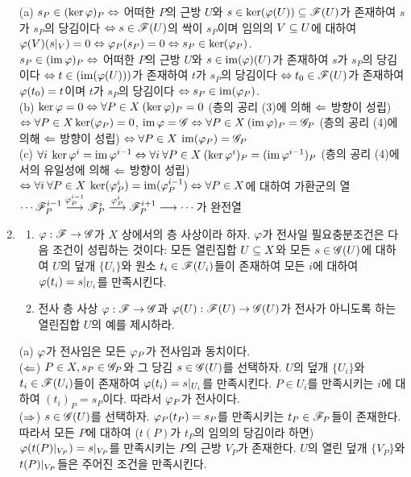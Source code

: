 \begin{enumerate}[label=\tb{1.\arabic*.},itemindent=0mm,itemsep=4mm]
	\sol (a) $s_P\in(\ker\varphi)_P\Leftrightarrow$ 어떠한 $P$의 근방 $U$와 $s\in\ker(\varphi(U))\subseteq\mathscr{F}(U)$가 존재하여 $s$가 $s_P$의 당김이다
	$\Leftrightarrow s\in\mathscr{F}(U)$의 싹이 $s_P$이며 임의의 $V\subseteq U$에 대하여 $\varphi(V)(s|_V)=0\Leftrightarrow\varphi_P(s_P)=0\Leftrightarrow s_P\in\ker(\varphi_P)$.\\
	$s_P\in(\operatorname{im}\varphi)_P\Leftrightarrow$ 어떠한 $P$의 근방 $U$와 $s\in\operatorname{im}(\varphi)(U)$가 존재하여 $s$가 $s_P$의 당김이다
	$\Leftrightarrow t\in(\operatorname{im}(\varphi(U)))$가 존재하여 $t$가 $s_P$의 당김이다
	$\Leftrightarrow t_0\in\mathscr{F}(U)$가 존재하여 $\varphi(t_0)=t$이며 $t$가 $s_P$의 당김이다 $\Leftrightarrow s_P\in\operatorname{im}(\varphi_P)$.\\
	(b) $\ker\varphi=0\Leftrightarrow\forall P\in X\:(\ker\varphi)_P=0$ (층의 공리 (3)에 의해 $\Leftarrow$ 방향이 성립) $\Leftrightarrow\forall P\in X\ker(\varphi_P)=0$,
	$\operatorname{im}\varphi=\mathscr{G}\Leftrightarrow\forall P\in X\:(\operatorname{im}\varphi)_P=\mathscr{G}_P$ (층의 공리 (4)에 의해 $\Leftarrow$ 방향이 성립)
	$\Leftrightarrow\forall P\in X\:\operatorname{im}(\varphi_P)=\mathscr{G}_P$\\
	(c) $\forall i\:\ker\varphi^i=\operatorname{im}\varphi^{i-1}\Leftrightarrow\forall i\:\forall P\in X\:(\ker\varphi^i)_P=(\operatorname{im}\varphi^{i-1})_P$
	(층의 공리 (4)에서의 유일성에 의해 $\Leftarrow$ 방향이 성립) $\Leftrightarrow\forall i\:\forall P\in X\:\ker(\varphi^i_P)=\operatorname{im}(\varphi^{i-1}_P)
	\Leftrightarrow\forall P\in X$에 대하여 가환군의 열 $\cdots\mathscr{F}^{i-1}_P\stackrel{\varphi^{i-1}_P}{\longrightarrow}\mathscr{F}^i_P\stackrel{\varphi^i_P}{\longrightarrow}\mathscr{F}^{i+1}_P\longrightarrow\cdots$가 완전열
	\item \begin{enumerate}[label=(\alph*)]
	\item $\varphi:\mathscr{F}\rightarrow\mathscr{G}$가 $X$ 상에서의 층 사상이라 하자. $\varphi$가 전사일 필요충분조건은 다음 조건이 성립하는 것이다:
	모든 열린집합 $U\subseteq X$와 모든 $s\in\mathscr{G}(U)$에 대하여 $U$의 덮개 $\{U_i\}$와 원소 $t_i\in\mathscr{F}(U_i)$들이 존재하여
	모든 $i$에 대하여 $\varphi(t_i)=s|_{U_i}$를 만족시킨다.
	\item 전사 층 사상 $\varphi:\mathscr{F}\rightarrow\mathscr{G}$과 $\varphi(U):\mathscr{F}(U)\rightarrow\mathscr{G}(U)$가 전사가 아니도록 하는 열린집합 $U$의 예를 제시하라.
	\end{enumerate}
	\sol (a) $\varphi$가 전사임은 모든 $\varphi_P$가 전사임과 동치이다.\\
	($\Leftarrow$) $P\in X,s_P\in\mathscr{G}_P$와 그 당김 $s\in\mathscr{G}(U)$를 선택하자.
	$U$의 덮개 $\{U_i\}$와 $t_i\in\mathscr{F}(U_i)$들이 존재하여 $\varphi(t_i)=s|_{U_i}$를 만족시킨다.
	$P\in U_i$를 만족시키는 $i$에 대하여 $(t_i)_P=s_P$이다. 따라서 $\varphi_P$가 전사이다.\\
	($\Rightarrow$) $s\in\mathscr{G}(U)$를 선택하자. $\varphi_P(t_P)=s_P$를 만족시키는 $t_P\in\mathscr{F}_P$들이 존재한다.
	따라서 모든 $P$에 대하여 ($t(P)$가 $t_P$의 임의의 당김이라 하면) $\varphi(t(P)|_{V_P})=s|_{V_P}$를 만족시키는
	$P$의 근방 $V_P$가 존재한다. $U$의 열린 덮개 $\{V_P\}$와 $t(P)|_{V_P}$들은 주어진 조건을 만족시킨다.\\

\end{enumerate}
